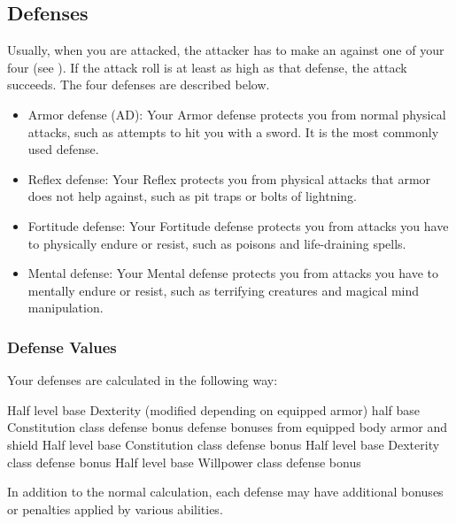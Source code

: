     \subsection{Defenses}\label{Defenses}
        Usually, when you are attacked, the attacker has to make an  against one of your four  (see ).
        If the attack roll is at least as high as that defense, the attack succeeds.
        The four defenses are described below.
        \begin{itemize}
            \item Armor defense (AD): Your Armor defense protects you from normal physical attacks, such as attempts to hit you with a sword.
                It is the most commonly used defense.
            \item Reflex defense: Your Reflex protects you from physical attacks that armor does not help against, such as pit traps or bolts of lightning.
            \item Fortitude defense: Your Fortitude defense protects you from attacks you have to physically endure or resist, such as poisons and life-draining spells.
            \item Mental defense: Your Mental defense protects you from attacks you have to mentally endure or resist, such as terrifying creatures and magical mind manipulation.
        \end{itemize}

        \subsubsection{Defense Values}\label{Defense Values}

            Your defenses are calculated in the following way:
            \begin{itemize}
                 Half level \add base Dexterity (modified depending on equipped armor) \add half base Constitution \add class defense bonus \add defense bonuses from equipped body armor and shield
                 Half level \add base Constitution \add class defense bonus
                 Half level \add base Dexterity \add class defense bonus
                 Half level \add base Willpower \add class defense bonus
            \end{itemize}
            In addition to the normal calculation, each defense may have additional bonuses or penalties applied by various abilities.

